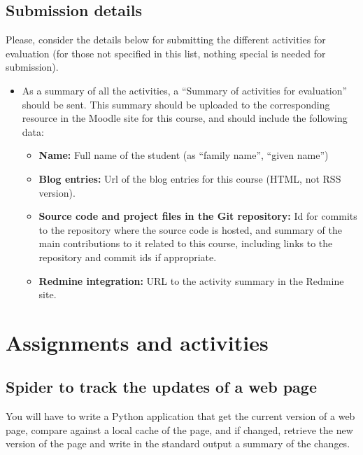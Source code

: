 \documentclass[a4paper]{article}
\begin{document}
\subsection{Submission details}

Please, consider the details below for submitting the different activities for evaluation (for those not specified in this list, nothing special is needed for submission).

\begin{itemize}
\item As a summary of all the activities, a ``Summary of activities
  for evaluation'' should be sent. This summary should be uploaded to
  the corresponding resource in the Moodle site for this course, and
  should include the following data: 
  \begin{itemize}
  \item \textbf{Name:} Full name of the student (as ``family name'', ``given name'')
  \item \textbf{Blog entries:} Url of the blog entries for this course (HTML, not RSS version).
  \item \textbf{Source code and project files in the Git repository:} Id for commits
    to the repository where the source code is hosted, and summary of
    the main contributions to it related to this course, including
    links to the repository and commit ids if appropriate. 
  \item \textbf{Redmine integration:} URL to the activity summary in
    the Redmine site.   
  \end{itemize}
\end{itemize}

\section{Assignments and activities}

\subsection{Spider to track the updates of a web page}
\label{sub:python}

You will have to write a Python application that get the current
version of a web page, compare against a local cache of the page, and
if changed, retrieve the new version of the page and write in the
standard output a summary of the changes.
\end{document}

